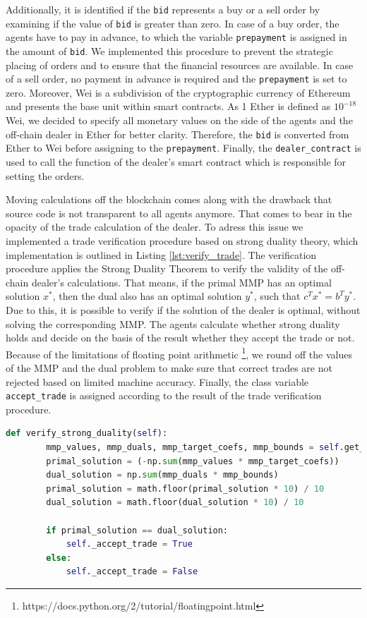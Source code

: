 Additionally, it is identified if the \verb|bid| represents a buy or a sell order by examining if the value 
of \verb|bid| is greater than zero. In case of a buy order, the agents have to pay in advance, to which 
the variable \verb|prepayment| is assigned in the amount of \verb|bid|.
We implemented this procedure to prevent the strategic placing of orders and to ensure 
that the financial resources are available.
In case of a sell order, no payment in advance is required and the \verb|prepayment| is set to zero.
Moreover, Wei is a subdivision of the cryptographic currency of Ethereum and presents the base unit within smart contracts.
As 1 Ether is defined as $10^{-18}$ Wei, we decided to specify all monetary values on the side 
of the agents and the off-chain dealer in Ether for better clarity.
Therefore, the \verb|bid| is converted from Ether to Wei before assigning to the \verb|prepayment|.
Finally, the \verb|dealer_contract| is used to call the function of the dealer's smart contract which is
responsible for setting the orders.

Moving calculations off the blockchain comes along with the drawback that source code is not
transparent to all agents anymore. 
That comes to bear in the opacity of the trade calculation of the dealer. 
To adress this issue we implemented a trade verification procedure based on 
strong duality theory, which implementation is outlined in Listing \ref{lst:verify_trade}.
The verification procedure applies the Strong Duality Theorem to verify the validity of the off-chain dealer's calculations.
That means, if the primal MMP has an optimal solution $x^{*}$, then 
the dual also has an optimal solution $y^{*}$, such that $c^{T}x^{*} = b^{T}y^{*}$.
Due to this, it is possible to verify if the solution of the dealer is optimal, without solving the corresponding MMP. 
The agents calculate whether strong duality holds and decide on the basis of the result whether they accept the trade or not.
Because of the limitations of floating point arithmetic \footnote{https://docs.python.org/2/tutorial/floatingpoint.html}, 
we round off the values of the MMP and the dual problem to make sure that correct trades 
are not rejected based on limited machine accuracy.
Finally, the class variable \verb|accept_trade| is assigned according to the result of the trade verification 
procedure.

\begin{lstlisting}[float=htbp, label=lst:verify_trade, caption=Verification of trades, language=Python]
    def verify_strong_duality(self):
        mmp_values, mmp_duals, mmp_target_coefs, mmp_bounds = self.get_mmp_attributes()
        primal_solution = (-np.sum(mmp_values * mmp_target_coefs))
        dual_solution = np.sum(mmp_duals * mmp_bounds)
        primal_solution = math.floor(primal_solution * 10) / 10
        dual_solution = math.floor(dual_solution * 10) / 10

        if primal_solution == dual_solution:
            self._accept_trade = True
        else:
            self._accept_trade = False
\end{lstlisting}


